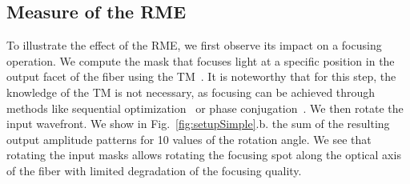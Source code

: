 \documentclass[aps,prl,twocolumn, amsmath,amssymb,superscriptaddress]{revtex4-2}
\DeclarePairedDelimiter\ket{\lvert}{\rangle}
\begin{document}
 


\subsection{Measure of the RME}

To illustrate the effect of the RME, 
we first observe its impact on a focusing operation. 
We compute the mask that focuses light at a specific position in the output facet of the fiber 
using the TM~\cite{Popoff2010Measuring,Cizmar2011shaping}. 
It is noteworthy that for this step, the knowledge of the TM is not necessary, 
as focusing can be achieved through methods
like sequential optimization~\cite{vellekoop2007focusing,Cizmar2010insitu} 
or phase conjugation~\cite{papadopoulos2012focusing}.
We then rotate the input wavefront.
We show in Fig.~\ref{fig:setupSimple}.b. the sum of the resulting output amplitude patterns 
for 10 values of the rotation angle. 
We see that rotating the input masks allows rotating the focusing spot 
along the optical axis of the fiber with limited degradation of the focusing quality.\\
\end{document}
